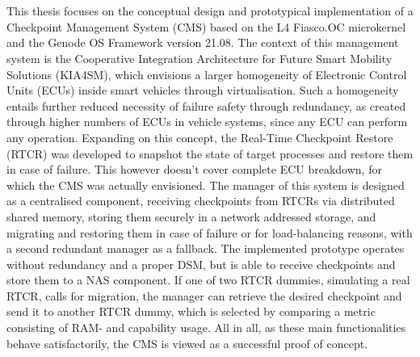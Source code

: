 \chapter{\abstractname}
This thesis focuses on the conceptual design and prototypical implementation of a Checkpoint Management System (CMS) based on the L4 Fiasco.OC microkernel and the Genode OS Framework version 21.08. The context of this management system is the Cooperative Integration Architecture for Future Smart Mobility Solutions (KIA4SM), which envisions a larger homogeneity of Electronic Control Units (ECUs) inside smart vehicles through virtualisation. Such a homogeneity entails further reduced necessity of failure safety through redundancy, as created through higher numbers of ECUs in vehicle systems, since any ECU can perform any operation. Expanding on this concept, the Real-Time Checkpoint Restore (RTCR) was developed to snapshot the state of target processes and restore them in case of failure. This however doesn't cover complete ECU breakdown, for which the CMS was actually envisioned. The manager of this system is designed as a centralised component, receiving checkpoints from RTCRs via distributed shared memory, storing them securely in a network addressed storage, and migrating and restoring them in case of failure or for load-balancing reasons, with a second redundant manager as a fallback. The implemented prototype operates without redundancy and a proper DSM, but is able to receive checkpoints and store them to a NAS component. If one of two RTCR dummies, simulating a real RTCR, calls for migration, the manager can retrieve the desired checkpoint and send it to another RTCR dummy, which is selected by comparing a metric consisting of RAM- and capability usage. All in all, as these main functionalities behave satisfactorily, the CMS is viewed as a successful proof of concept.
